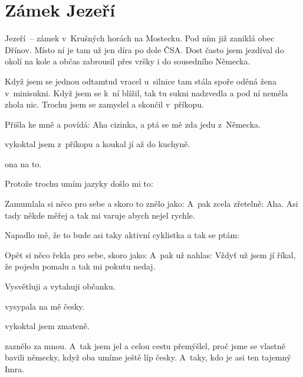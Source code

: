 
\chapter{Zámek Jezeří}

Jezeří~-- zámek v~Krušných horách na Mostecku. Pod ním již zaniklá obec Dřínov.
Místo ní je tam už jen díra po dole ČSA. Dost často jsem jezdíval do okolí na
kole a občas zabrousil přes vršky i do sousedního Německa.

Když jsem se jednou odtamtud vracel u~silnice tam stála spoře oděná žena
v~minisukni. Když jsem se k~ní blížil, tak tu sukni nadzvedla a pod ní neměla
zhola nic. Trochu jsem se zamyslel a skončil v~příkopu.

Přišla ke mně a povídá:  Aha
cizinka, a ptá se mě zda jedu z~Německa.

 vykoktal jsem z~příkopu a koukal jí až do
kuchyně.

 ona na to.

Protože trochu umím jazyky došlo mi to: 

Zamumlala si něco pro sebe a skoro to znělo jako:  A~pak zcela zřetelně:  Aha. Asi tady
někde měřej a tak mi varuje abych nejel rychle.

 Napadlo mě, že to bude asi taky
aktivní cyklistka a tak se ptám:  

Opět si něco řekla pro sebe, skoro jako:  A~pak už nahlas: 
Vždyť už jsem jí říkal, že pojedu pomalu a tak mi pokutu nedaj.

 Vysvětluji a vytahuji
občanku.

 vysypala na mě česky.

 vykoktal jsem zmateně.

 zaznělo za mnou. A~tak jsem jel a celou cestu
přemýšlel, proč jsme se vlastně bavili německy, když oba umíme ještě líp česky.
A~taky, kdo je asi ten tajemný Imra.

